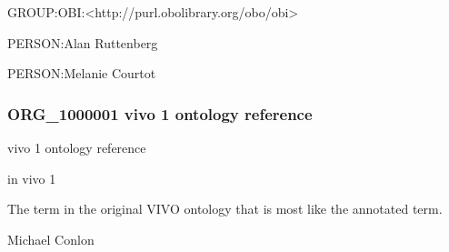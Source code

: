 \documentclass[letterpaper,10pt,english]{sphinxmanual}
\begin{document}
\begin{sphinxShadowBox}

\sphinxAtStartPar
GROUP:OBI:\textless{}http://purl.obolibrary.org/obo/obi\textgreater{}
\end{sphinxShadowBox}

\begin{sphinxShadowBox}

\sphinxAtStartPar
PERSON:Alan Ruttenberg

\sphinxAtStartPar
PERSON:Melanie Courtot
\end{sphinxShadowBox}
\begin{quote}

\ignorespaces \end{quote}


\subsubsection{ORG\_1000001 \sphinxhyphen{} vivo 1 ontology reference}
\label{\detokenize{doc-ORG_1000001:org-1000001-vivo-1-ontology-reference}}\label{\detokenize{doc-ORG_1000001:index-0}}\label{\detokenize{doc-ORG_1000001::doc}}
\begin{sphinxShadowBox}

\sphinxAtStartPar
vivo 1 ontology reference
\end{sphinxShadowBox}

\begin{sphinxShadowBox}

\sphinxAtStartPar
in vivo 1
\end{sphinxShadowBox}

\begin{sphinxShadowBox}

\sphinxAtStartPar
The term in the original VIVO ontology that is most like the annotated term.
\end{sphinxShadowBox}

\begin{sphinxShadowBox}

\sphinxAtStartPar
Michael Conlon 
\end{sphinxShadowBox}
\end{document}
